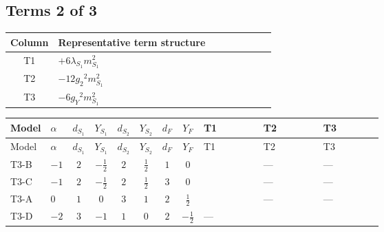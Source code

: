 \documentclass[8pt]{article}
\begin{document}
\begin{landscape}
\subsection*{Terms 2 of 3}
\begin{center}
\begin{tabular}{@{}c >{\raggedright\arraybackslash}p{0.82\linewidth}@{}}
\toprule
Column & Representative term structure \\
\midrule
T1 & \(\displaystyle +6 {\lambda_{S_1}} {m_{S_1}^2}\) \\
\midrule
T2 & \(\displaystyle -12 {g_2}^2 {m_{S_1}^2}\) \\
\midrule
T3 & \(\displaystyle -6 {g_Y}^2 {m_{S_1}^2}\) \\
\midrule
\bottomrule
\end{tabular}
\end{center}
\smallskip
\tiny
\begin{longtable}{@{}llcccccc >{\raggedright\arraybackslash}p{0.21\linewidth} >{\raggedright\arraybackslash}p{0.21\linewidth} >{\raggedright\arraybackslash}p{0.21\linewidth}@{}}
\toprule
Model & $\alpha$ & $d_{S_1}$ & $Y_{S_1}$ & $d_{S_2}$ & $Y_{S_2}$ & $d_F$ & $Y_F$ & T1 & T2 & T3 \\
\midrule
\endfirsthead
\toprule
Model & $\alpha$ & $d_{S_1}$ & $Y_{S_1}$ & $d_{S_2}$ & $Y_{S_2}$ & $d_F$ & $Y_F$ & T1 & T2 & T3 \\
\midrule
\endhead
T3-B & $-1$ & $2$ & $-\frac{1}{2}$ & $2$ & $\frac{1}{2}$ & $1$ & $0$ & \scriptsize\adjustbox{max width=\linewidth}{$\begin{gathered} +6 {\lambda_{S_1}} {m_{S_1}^2}\end{gathered}$} & --- & --- \\
\midrule
T3-C & $-1$ & $2$ & $-\frac{1}{2}$ & $2$ & $\frac{1}{2}$ & $3$ & $0$ & \scriptsize\adjustbox{max width=\linewidth}{$\begin{gathered} +6 {\lambda_{S_1}} {m_{S_1}^2}\end{gathered}$} & --- & --- \\
\midrule
T3-A & $0$ & $1$ & $0$ & $3$ & $1$ & $2$ & $\frac{1}{2}$ & \scriptsize\adjustbox{max width=\linewidth}{$\begin{gathered} +4 {\lambda_{S_1}} {m_{S_1}^2}\end{gathered}$} & --- & --- \\
\midrule
T3-D & $-2$ & $3$ & $-1$ & $1$ & $0$ & $2$ & $-\frac{1}{2}$ & --- & \scriptsize\adjustbox{max width=\linewidth}{$\begin{gathered} -12 {g_2}^2 {m_{S_1}^2}\end{gathered}$} & \scriptsize\adjustbox{max width=\linewidth}{$\begin{gathered} -6 {g_Y}^2 {m_{S_1}^2}\end{gathered}$} \\

\end{longtable}
\end{landscape}
\end{document}
